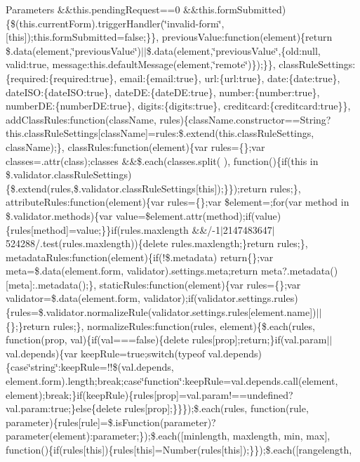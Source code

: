 \begin{DoxyParams}{Parameters}
\&\&this.\+pending\+Request==0 \&\&this.\+form\+Submitted)\{\$(this.\+current\+Form).trigger\+Handler(\char`\"{}invalid-\/form\char`\"{}, \mbox{[}this\mbox{]});this.\+form\+Submitted=false;\}\}, previous\+Value\+:function(element)\{return \$.data(element,\char`\"{}previous\+Value\char`\"{})$\vert$$\vert$\$.data(element,\char`\"{}previous\+Value\char`\"{},\{old\+:null, valid\+:true, message\+:this.\+default\+Message(element,\char`\"{}remote\char`\"{})\});\}\}, class\+Rule\+Settings\+:\{required\+:\{required\+:true\}, email\+:\{email\+:true\}, url\+:\{url\+:true\}, date\+:\{date\+:true\}, date\+I\+S\+O\+:\{date\+I\+S\+O\+:true\}, date\+D\+E\+:\{date\+D\+E\+:true\}, number\+:\{number\+:true\}, number\+D\+E\+:\{number\+D\+E\+:true\}, digits\+:\{digits\+:true\}, creditcard\+:\{creditcard\+:true\}\}, add\+Class\+Rules\+:function(class\+Name, rules)\{class\+Name.\+constructor==String?this.\+class\+Rule\+Settings\mbox{[}class\+Name\mbox{]}=rules\+:\$.extend(this.\+class\+Rule\+Settings, class\+Name);\}, class\+Rules\+:function(element)\{var rules=\{\};var classes=.attr(\textquotesingle{}class\textquotesingle{});classes \&\&\$.each(classes.\+split(\textquotesingle{} \textquotesingle{}), function()\{if(this in \$.validator.\+class\+Rule\+Settings)\{\$.extend(rules,\$.validator.\+class\+Rule\+Settings\mbox{[}this\mbox{]});\}\});return rules;\}, attribute\+Rules\+:function(element)\{var rules=\{\};var \$element=;for(var method in \$.validator.\+methods)\{var value=\$element.\+attr(method);if(value)\{rules\mbox{[}method\mbox{]}=value;\}\}if(rules.\+maxlength \&\&/-\/1$\vert$2147483647$\vert$524288/.test(rules.\+maxlength))\{delete rules.\+maxlength;\}return rules;\}, metadata\+Rules\+:function(element)\{if(!\$.metadata) return\{\};var meta=\$.data(element.\+form, \textquotesingle{}validator\textquotesingle{}).settings.\+meta;return meta?.metadata()\mbox{[}meta\mbox{]}\+:.metadata();\}, static\+Rules\+:function(element)\{var rules=\{\};var validator=\$.data(element.\+form, \textquotesingle{}validator\textquotesingle{});if(validator.\+settings.\+rules)\{rules=\$.validator.\+normalize\+Rule(validator.\+settings.\+rules\mbox{[}element.\+name\mbox{]})$\vert$$\vert$\{\};\}return rules;\}, normalize\+Rules\+:function(rules, element)\{\$.each(rules, function(prop, val)\{if(val===false)\{delete rules\mbox{[}prop\mbox{]};return;\}if(val.\+param$\vert$$\vert$val.depends)\{var keep\+Rule=true;switch(typeof val.\+depends)\{case\char`\"{}string\char`\"{}\+:keep\+Rule=!!\$(val.\+depends, element.\+form).length;break;case\char`\"{}function\char`\"{}\+:keep\+Rule=val.\+depends.\+call(element, element);break;\}if(keep\+Rule)\{rules\mbox{[}prop\mbox{]}=val.\+param!==undefined?val.\+param\+:true;\}else\{delete rules\mbox{[}prop\mbox{]};\}\}\});\$.each(rules, function(rule, parameter)\{rules\mbox{[}rule\mbox{]}=\$.is\+Function(parameter)?parameter(element)\+:parameter;\});\$.each(\mbox{[}\textquotesingle{}minlength\textquotesingle{}, \textquotesingle{}maxlength\textquotesingle{}, \textquotesingle{}min\textquotesingle{}, \textquotesingle{}max\textquotesingle{}\mbox{]}, function()\{if(rules\mbox{[}this\mbox{]})\{rules\mbox{[}this\mbox{]}=Number(rules\mbox{[}this\mbox{]});\}\});\$.each(\mbox{[}\textquotesingle{}rangelength\textquotesingle{}, 
\end{DoxyParams}
